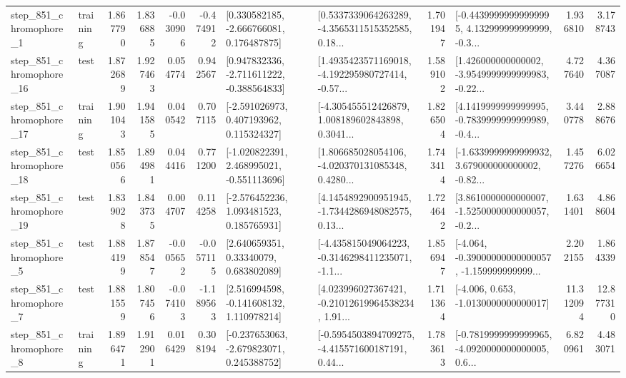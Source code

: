 \begin{tabular}{llrrrrllrlrr}
   step\_851\_chromophore\_1 &  training &      1.867790 &    1.836885 &     -0.030906 & -0.474912 &    [0.330582185, -2.666766081, 0.176487875] &  [0.5337339064263289, -4.3565311515352585, 0.18... &       1.701947 &  [-0.44399999999999995, 4.132999999999999, -0.3... &            1.936810 &          3.178743 \\
  step\_851\_chromophore\_16 &      test &      1.872689 &    1.927463 &      0.054774 &  0.942567 &   [0.947832336, -2.711611222, -0.388564833] &  [1.4935423571169018, -4.192295980727414, -0.57... &       1.589102 &  [1.426000000000002, -3.9549999999999983, -0.22... &            4.727640 &          4.367087 \\
  step\_851\_chromophore\_17 &  training &      1.901043 &    1.941585 &      0.040542 &  0.707115 &    [-2.591026973, 0.407193962, 0.115324327] &  [-4.305455512426879, 1.008189602843898, 0.3041... &       1.826504 &  [4.1419999999999995, -0.7839999999999989, -0.4... &            3.440778 &          2.888676 \\
  step\_851\_chromophore\_18 &      test &      1.850566 &    1.894981 &      0.044416 &  0.771200 &   [-1.020822391, 2.468995021, -0.551113696] &  [1.806685028054106, -4.020370131085348, 0.4280... &       1.743414 &  [-1.6339999999999932, 3.679000000000002, -0.82... &            1.457276 &          6.026654 \\
  step\_851\_chromophore\_19 &      test &      1.839028 &    1.843735 &      0.004707 &  0.114258 &    [-2.576452236, 1.093481523, 0.185765931] &  [4.1454892900951945, -1.7344286948082575, 0.13... &       1.724642 &  [3.8610000000000007, -1.5250000000000057, -0.2... &            1.631401 &          4.868604 \\
   step\_851\_chromophore\_5 &      test &      1.884199 &    1.878547 &     -0.005652 & -0.057115 &      [2.640659351, 0.33340079, 0.683802089] &  [-4.435815049064223, -0.3146298411235071, -1.1... &       1.856947 &  [-4.064, -0.39000000000000057, -1.159999999999... &            2.202155 &          1.864339 \\
   step\_851\_chromophore\_7 &      test &      1.881559 &    1.807456 &     -0.074103 & -1.189563 &    [2.516994598, -0.141608132, 1.110978214] &  [4.023996027367421, -0.21012619964538234, 1.91... &       1.711364 &               [-4.006, 0.653, -1.0130000000000017] &           11.312094 &         12.877310 \\
   step\_851\_chromophore\_8 &  training &      1.896471 &    1.912901 &      0.016429 &  0.308194 &   [-0.237653063, -2.679823071, 0.245388752] &  [-0.5954503894709275, -4.415571600187191, 0.44... &       1.783613 &  [-0.7819999999999965, -4.0920000000000005, 0.6... &            6.820961 &          4.483071 \\

\end{tabular}
